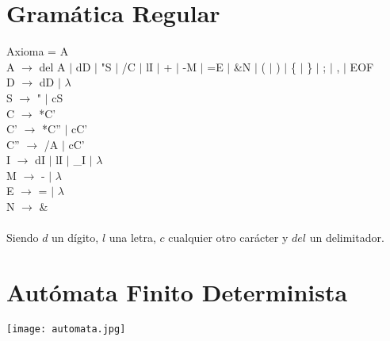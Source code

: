 \documentclass{article}
\begin{document}
\section{Gramática Regular}
\noindent
Axioma = A\\
A $\rightarrow$ del A $|$ dD $|$ "S $|$ /C $|$ lI $|$ + $|$ -M $|$ =E $|$ \&N $|$ ( $|$ ) $|$ \{ $|$ \} $|$ ; $|$ , $|$ EOF\\
D $\rightarrow$ dD $|$ $\lambda$\\
S $\rightarrow$ " $|$ cS\\
C $\rightarrow$ *C'\\
C' $\rightarrow$ *C'' $|$ cC'\\
C'' $\rightarrow$ /A $|$ cC'\\
I $\rightarrow$ dI $|$ lI $|$ \_I $|$ $\lambda$\\
M $\rightarrow$ - $|$ $\lambda$\\
E $\rightarrow$ = $|$ $\lambda$\\
N $\rightarrow$ \&\\
\\
Siendo $d$ un dígito, $l$ una letra, $c$ cualquier otro carácter y $del$ un delimitador.
\section{Autómata Finito Determinista}
\begin{center}
\texttt{[image: automata.jpg]}
\end{center}

\clearpage
\end{document}
